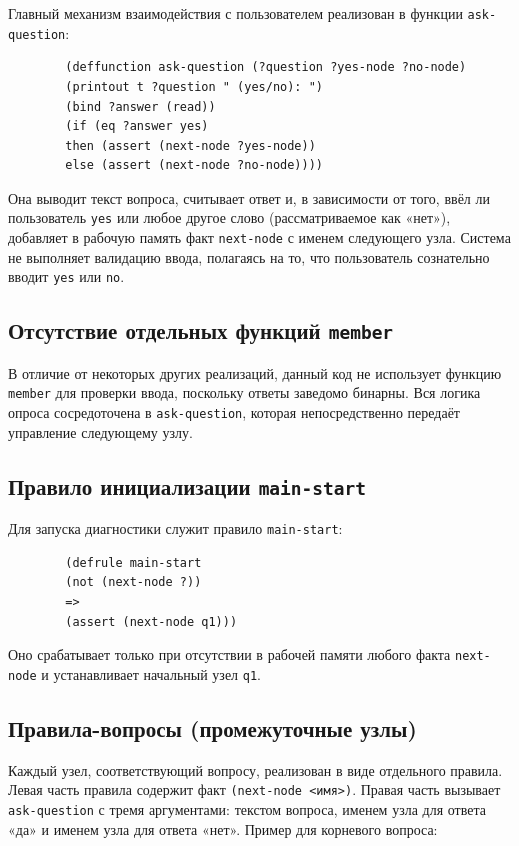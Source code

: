 \documentclass[a4paper, final]{extarticle}
\begin{document}
	Главный механизм взаимодействия с пользователем реализован в функции \texttt{ask-question}:
	
	\begin{lstlisting}
		(deffunction ask-question (?question ?yes-node ?no-node)
		(printout t ?question " (yes/no): ")
		(bind ?answer (read))
		(if (eq ?answer yes)
		then (assert (next-node ?yes-node))
		else (assert (next-node ?no-node))))
	\end{lstlisting}
	
	Она выводит текст вопроса, считывает ответ и, в зависимости от того, ввёл ли пользователь \texttt{yes} или любое другое слово (рассматриваемое как «нет»), добавляет в рабочую память факт \texttt{next-node} с именем следующего узла. Система не выполняет валидацию ввода, полагаясь на то, что пользователь сознательно вводит \texttt{yes} или \texttt{no}.
	
	\subsection{Отсутствие отдельных функций \texttt{member}}
	
	В отличие от некоторых других реализаций, данный код не использует функцию \texttt{member} для проверки ввода, поскольку ответы заведомо бинарны. Вся логика опроса сосредоточена в \texttt{ask-question}, которая непосредственно передаёт управление следующему узлу.
	
	\subsection{Правило инициализации \texttt{main-start}}
	
	Для запуска диагностики служит правило \texttt{main-start}:
	
	\begin{lstlisting}
		(defrule main-start
		(not (next-node ?))
		=>
		(assert (next-node q1)))
	\end{lstlisting}
	
	Оно срабатывает только при отсутствии в рабочей памяти любого факта \texttt{next-node} и устанавливает начальный узел \texttt{q1}.
	
	\subsection{Правила-вопросы (промежуточные узлы)}
	
	Каждый узел, соответствующий вопросу, реализован в виде отдельного правила. Левая часть правила содержит факт \texttt{(next-node <имя>)}. Правая часть вызывает \texttt{ask-question} с тремя аргументами: текстом вопроса, именем узла для ответа «да» и именем узла для ответа «нет». Пример для корневого вопроса:
	
\end{document}
